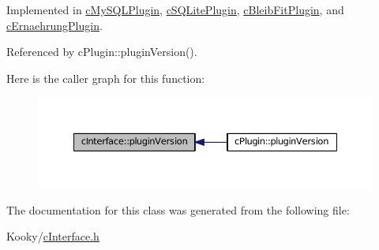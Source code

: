 Implemented in \hyperlink{classc_my_s_q_l_plugin_af9f85d9af71685b373b114d8d2d98c6a}{c\+My\+S\+Q\+L\+Plugin}, \hyperlink{classc_s_q_lite_plugin_a680ffa394cab1bd545080c4ea72bd442}{c\+S\+Q\+Lite\+Plugin}, \hyperlink{classc_bleib_fit_plugin_acb4fbabe875079913c8bbbbe7d9089f6}{c\+Bleib\+Fit\+Plugin}, and \hyperlink{classc_ernaehrung_plugin_a9f94e9684b541b55e67b87bff7a0a028}{c\+Ernaehrung\+Plugin}.



Referenced by c\+Plugin\+::plugin\+Version().



Here is the caller graph for this function\+:
\nopagebreak
\begin{figure}[H]
\begin{center}
\leavevmode
\includegraphics[width=350pt]{classc_interface_aadc382036174c2a25bb2c23733830d33_icgraph}
\end{center}
\end{figure}




The documentation for this class was generated from the following file\+:\begin{DoxyCompactItemize}
\item 
Kooky/\hyperlink{c_interface_8h}{c\+Interface.\+h}\end{DoxyCompactItemize}
